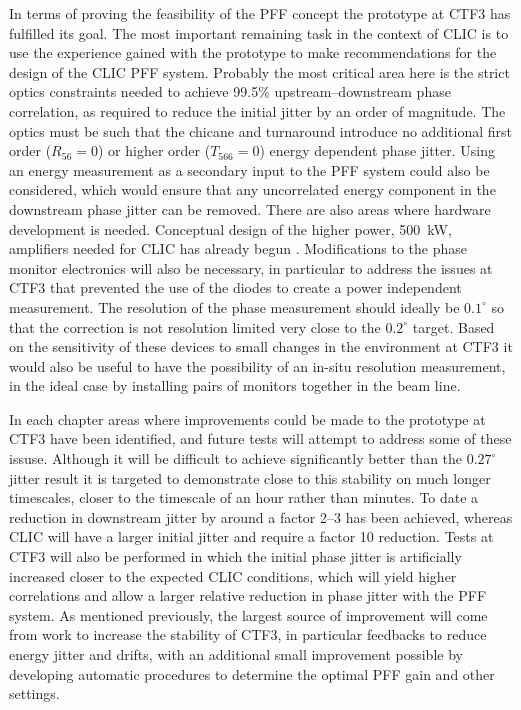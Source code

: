 In terms of proving the feasibility of the PFF concept the prototype at CTF3 has fulfilled its goal.  The most important remaining task in the context of CLIC is to use the experience gained with the prototype to make recommendations for the design of the CLIC PFF system. Probably the most critical area here is the strict optics constraints needed to achieve 99.5\% upstream--downstream phase correlation, as required to reduce the initial jitter by an order of magnitude. The optics must be such that the chicane and turnaround introduce no additional first order (\(R_{56} = 0\)) or higher order (\(T_{566} = 0\)) energy dependent phase jitter. Using an energy measurement as a secondary input to the PFF system could also be considered, which would ensure that any uncorrelated energy component in the downstream phase jitter can be removed. There are also areas where hardware development is needed. Conceptual design of the higher power, 500~kW, amplifiers needed for CLIC has already begun \cite{colinCLIC16}. Modifications to the phase monitor electronics will also be necessary, in particular to address the issues at CTF3 that prevented the use of the diodes to create a power independent measurement. The resolution of the phase measurement should ideally be \(0.1^\circ\) so that the correction is not resolution limited very close to the \(0.2^\circ\) target. Based on the sensitivity of these devices to small changes in the environment at CTF3 it would also be useful to have the possibility of an in-situ resolution measurement, in the ideal case by installing pairs of monitors together in the beam line.

In each chapter areas where improvements could be made to the prototype at CTF3 have been identified, and future tests will attempt to address some of these issuse. Although it will be difficult to achieve significantly better than the \(0.27^\circ\) jitter result it is targeted to demonstrate close to this stability on much longer timescales, closer to the timescale of an hour rather than minutes. To date a reduction in downstream jitter by around a factor 2--3 has been achieved, whereas CLIC will have a larger initial jitter and require a factor 10 reduction. Tests at CTF3 will also be performed in which the initial phase jitter is artificially increased closer to the expected CLIC conditions, which will yield higher correlations and allow a larger relative reduction in phase jitter with the PFF system. As mentioned previously, the largest source of improvement will come from work to increase the stability of CTF3, in particular feedbacks to reduce energy jitter and drifts, with an additional small improvement possible by developing automatic procedures to determine the optimal PFF gain and other settings.


